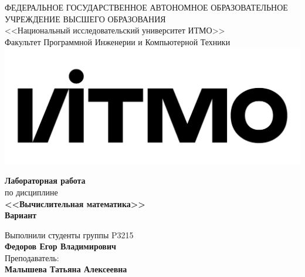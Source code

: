 \begin{titlepage}
	\thispagestyle{firststyle}
	\begin{center}
		ФЕДЕРАЛЬНОЕ ГОСУДАРСТВЕННОЕ АВТОНОМНОЕ ОБРАЗОВАТЕЛЬНОЕ УЧРЕЖДЕНИЕ ВЫСШЕГО ОБРАЗОВАНИЯ\\
		\vspace{0.5cm}
		<<Национальный исследовательский университет ИТМО>>\\
		Факультет Программной Инженерии и Компьютерной Техники \\
		\vspace{1cm}
		\includegraphics[scale=0.1]{img/itmo_logo.png}
	\end{center}

	\vspace{1cm}

	\begin{center}
		\large
		\textbf{Лабораторная работа }\\
		по дисциплине\\
		\textbf{<<Вычислительная математика>>} \\
		\textbf{Вариант }
	\end{center}

	\vspace{2cm}

	\begin{flushright}
		Выполнили студенты  группы P3215\\
		\textbf{Федоров Егор Владимирович} \\
		Преподаватель: \\
		\textbf{Малышева Татьяна Алексеевна}\\
	\end{flushright}

\end{titlepage}

